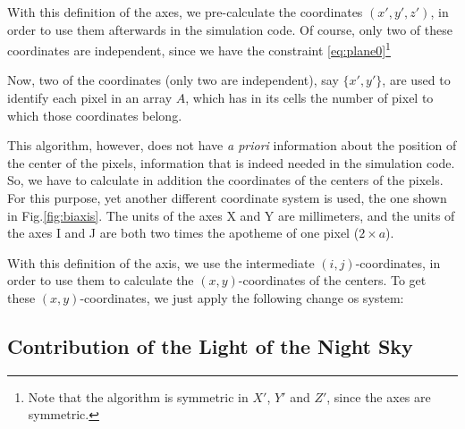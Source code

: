 With this definition of the axes, we pre-calculate the coordinates
$(x',y',z')$, in order to use them afterwards in the simulation code.
Of course, only two of these coordinates are independent, since we
have the constraint \eqref{eq:plane0}\footnote{Note that the algorithm
  is symmetric in $X'$, $Y'$ and $Z'$, since the axes are symmetric.}
  
Now, two of the coordinates (only two are independent), say
$\{x',y'\}$, are used to identify each pixel in an array $A$, which
has in its cells the number of pixel to which those coordinates
belong.

This algorithm, however, does not have {\itshape a priori} information
about the position of the center of the pixels, information that is
indeed needed in the simulation code. So, we have to calculate in
addition the coordinates of the centers of the pixels. For this
purpose, yet another different coordinate system is used, the one
shown in Fig.\ref{fig:biaxis}. The units of the axes X and Y are
millimeters, and the units of the axes I and J are both two times the
apotheme of one pixel ($2 \times a$).


With this definition of the axis, we use the intermediate
$(i,j)$-coordinates, in order to use them to calculate the
$(x,y)$-coordinates of the centers. To get these $(x,y)$-coordinates,
we just apply the following change os system:
%
\bitoeucleq

\subsection{Contribution of the Light of the Night Sky}

